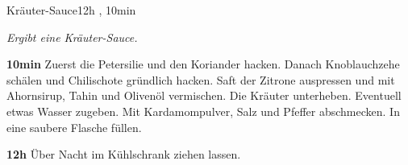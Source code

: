 \documentclass[../recipe-collections/cooking.tex]{subfiles}
\begin{document}
\begin{recipe}{Kräuter-Sauce}{}{12h , 10min}

  \freeform{}\textit{Ergibt eine Kräuter-Sauce.}


  \textbf{10min}
  Zuerst die Petersilie und den Koriander hacken.
  Danach Knoblauchzehe schälen und Chilischote gründlich hacken.
  Saft der Zitrone auspressen und mit Ahornsirup, Tahin und Olivenöl vermischen.
  Die Kräuter unterheben.
  Eventuell etwas Wasser zugeben.
  Mit Kardamompulver, Salz und Pfeffer abschmecken.
  In eine saubere Flasche füllen.

  \newstep{}\textbf{12h}
  Über Nacht im Kühlschrank ziehen lassen.

  \freeform{}\hrulefill{}

\end{recipe}
\end{document}
